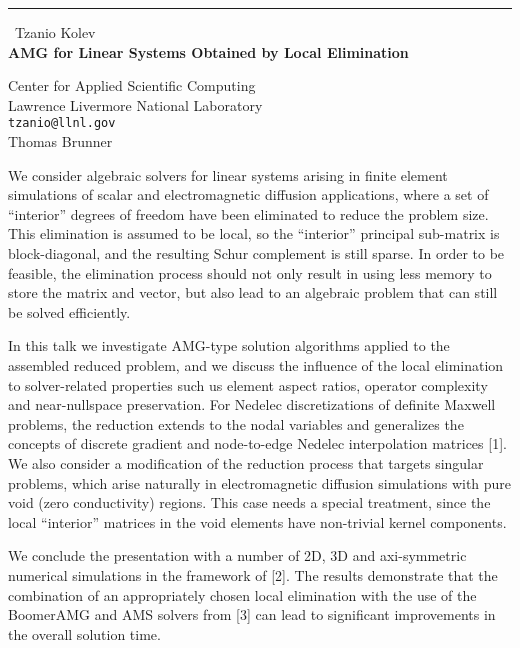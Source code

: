 \documentclass{report}
\begin{document}
\begin{center}
\rule{6in}{1pt} \
{\large Tzanio Kolev \\
{\bf AMG for Linear Systems Obtained by Local Elimination}}

Center for Applied Scientific Computing \\ Lawrence Livermore National Laboratory
\\
{\tt tzanio@llnl.gov}\\
Thomas Brunner\end{center}

We consider algebraic solvers for linear systems arising in finite
element simulations of scalar and electromagnetic diffusion applications,
where a set of ``interior'' degrees of freedom have been eliminated to
reduce the problem size. This elimination is assumed to be local, so the
``interior'' principal sub-matrix is block-diagonal, and the resulting
Schur complement is still sparse. In order to be feasible, the
elimination process should not only result in using less memory to store
the matrix and vector, but also lead to an algebraic problem that can
still be solved efficiently.

In this talk we investigate AMG-type solution algorithms applied to the
assembled reduced problem, and we discuss the influence of the local
elimination to solver-related properties such us element aspect ratios,
operator complexity and near-nullspace preservation. For Nedelec
discretizations of definite Maxwell problems, the reduction extends to
the nodal variables and generalizes the concepts of discrete gradient and
node-to-edge Nedelec interpolation matrices [1]. We also consider a
modification of the reduction process that targets singular problems,
which arise naturally in electromagnetic diffusion simulations with pure
void (zero conductivity) regions. This case needs a special treatment,
since the local ``interior'' matrices in the void elements have
non-trivial kernel components.

We conclude the presentation with a number of 2D, 3D and axi-symmetric
numerical simulations in the framework of [2]. The results demonstrate
that the combination of an appropriately chosen local elimination with
the use of the BoomerAMG and AMS solvers from [3] can lead to significant
improvements in the overall solution time.

\bigskip
\end{document}
